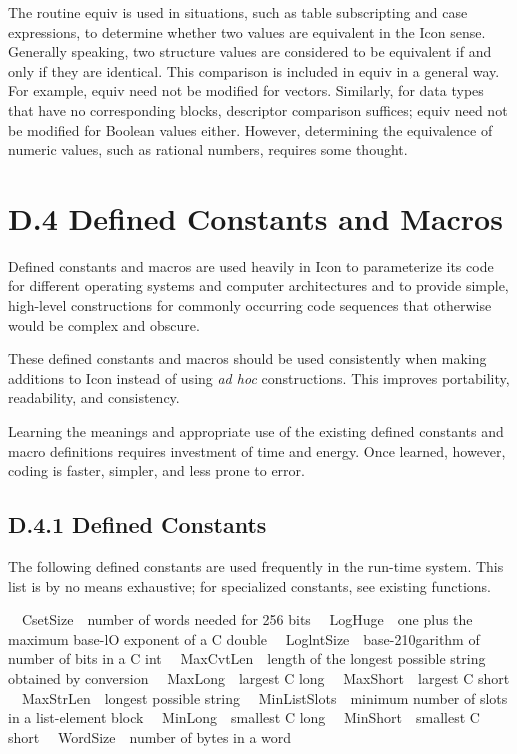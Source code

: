 The routine equiv is used in situations, such as table subscripting
and case expressions, to determine whether two values are equivalent
in the Icon sense. Generally speaking, two structure values are
considered to be equivalent if and only if they are identical. This
comparison is included in equiv in a general way. For example, equiv
need not be modified for vectors. Similarly, for data types that have
no corresponding blocks, descriptor comparison suffices; equiv need
not be modified for Boolean values either. However, determining the
equivalence of numeric values, such as rational numbers, requires some
thought.


\section[D.4 Defined Constants and Macros]{D.4 Defined Constants and Macros}

Defined constants and macros are used heavily in Icon to parameterize
its code for different operating systems and computer architectures
and to provide simple, high-level constructions for commonly occurring
code sequences that otherwise would be complex and obscure.

These defined constants and macros should be used consistently when
making additions to Icon instead of using \textit{ad hoc}
constructions. This improves portability, readability, and
consistency.

Learning the meanings and appropriate use of the existing defined
constants and macro definitions requires investment of time and
energy. Once learned, however, coding is faster, simpler, and less
prone to error.

\subsection{D.4.1 Defined Constants}

The following defined constants are used frequently in the run-time
system. This list is by no means exhaustive; for specialized
constants, see existing functions.


\ \ CsetSize\ \ number of words needed for 256 bits\newline
\ \ LogHuge\ \ one plus the maximum base-lO exponent of a C double\newline
\ \ LoglntSize\ \ base-210garithm of number of bits in a C int\newline
\ \ MaxCvtLen\ \ length of the longest possible string obtained by conversion\newline
\ \ MaxLong\ \ largest C long\newline
\ \ MaxShort\ \ largest C short\newline
\ \ MaxStrLen\ \ longest possible string\newline
\ \ MinListSlots\ \ minimum number of slots in a list-element block\newline
\ \ MinLong\ \ smallest C long\newline
\ \ MinShort\ \ smallest C short\newline
\ \ WordSize\ \ number of bytes in a word

